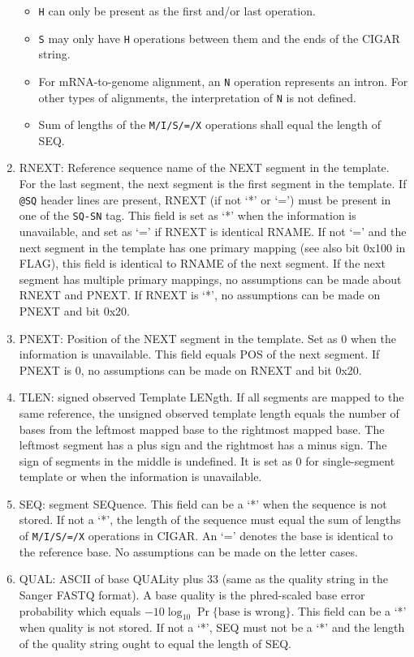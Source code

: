 \documentclass[10pt]{article}
\begin{document}
\begin{enumerate}
  \begin{itemize}
  \item {\tt H} can only be present as the first and/or last operation.
  \item {\tt S} may only have {\tt H} operations between them and the
    ends of the {\sf CIGAR} string.
  \item For mRNA-to-genome alignment, an {\tt N} operation represents an
    intron. For other types of alignments, the interpretation of {\tt N}
    is not defined.
  \item Sum of lengths of the {\tt M/I/S/=/X} operations shall equal
    the length of {\sf SEQ}.
  \end{itemize}
\item {\sf RNEXT}: Reference sequence name of the NEXT segment in the
  template. For the last segment, the next segment is the first
  segment in the template. If {\tt @SQ} header lines are present, {\sf
    RNEXT} (if not `*' or `=') must be present in one of the {\tt SQ-SN}
  tag. This field is set as `*' when the information is unavailable, and
  set as `=' if {\sf RNEXT} is identical {\sf RNAME}. If not `=' and the
  next segment in the template has one primary mapping (see also bit
  0x100 in {\sf FLAG}), this field is identical to {\sf RNAME} of the
  next segment.  If the next segment has multiple primary mappings, no
  assumptions can be made about {\sf RNEXT} and {\sf PNEXT}.  If {\sf
    RNEXT} is `*', no assumptions can be made on {\sf PNEXT} and bit
  0x20.
\item {\sf PNEXT}: Position of the NEXT segment in the template. Set as
  0 when the information is unavailable. This field equals {\sf POS} of
  the next segment. If {\sf PNEXT} is 0, no assumptions can be made on
  {\sf RNEXT} and bit 0x20.
\item {\sf TLEN}: signed observed Template LENgth. If all segments are
  mapped to the same reference, the unsigned observed template length
  equals the number of bases from the leftmost mapped base to the
  rightmost mapped base. The leftmost segment has a plus sign and the
  rightmost has a minus sign. The sign of segments in the middle is
  undefined. It is set as 0 for single-segment template or when the
  information is unavailable.
\item {\sf SEQ}: segment SEQuence. This field can be a `*' when the
  sequence is not stored. If not a `*', the length of the sequence must
  equal the sum of lengths of {\tt M/I/S/=/X} operations in {\sf CIGAR}.
  An `=' denotes the base is identical to the reference base. No
  assumptions can be made on the letter cases.
\item {\sf QUAL}: ASCII of base QUALity plus 33 (same as the quality
  string in the Sanger FASTQ format). A base quality is the phred-scaled
  base error probability which equals $-10\log_{10}\Pr\{\mbox{base is
    wrong}\}$. This field can be a `*' when quality is not stored. If
  not a `*', {\sf SEQ} must not be a `*' and the length of the quality string
  ought to equal the length of {\sf SEQ}.
\end{enumerate}
\end{document}
